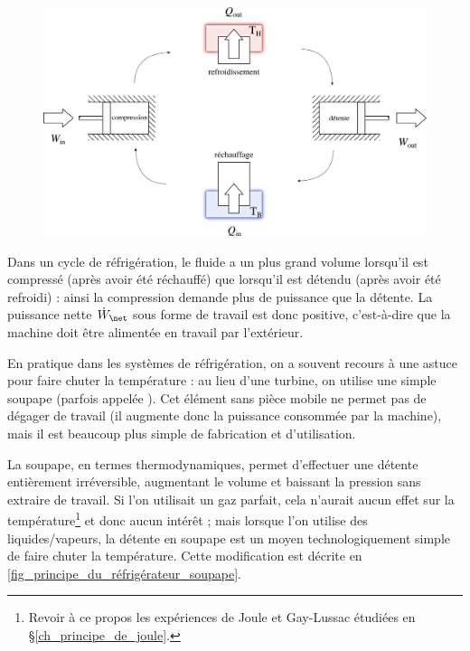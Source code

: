 			\begin{figure}
				\begin{center}
					\includegraphics[width=\textwidth]{images/refrigerateur_climatiseur_thermopompe_sf.png}
				\end{center}
				\label{fig_refrigerateur_climatiseur_thermopompe_sf}
			\end{figure}

			Dans un cycle de réfrigération, le fluide a un plus grand volume lorsqu’il est compressé (après avoir été réchauffé) que lorsqu’il est détendu (après avoir été refroidi) : ainsi la compression demande plus de puissance que la détente. La puissance nette $\dot W_\net$ sous forme de travail est donc positive, c’est-à-dire que la machine doit être alimentée en travail par l’extérieur.

			\clearfloats
			En pratique dans les systèmes de réfrigération, on a souvent recours à une astuce pour faire chuter la température : au lieu d’une turbine, on utilise une simple soupape (parfois appelée ). Cet élément sans pièce mobile ne permet pas de dégager de travail (il augmente donc la puissance consommée par la machine), mais il est beaucoup plus simple de fabrication et d’utilisation.

			La soupape, en termes thermodynamiques, permet d’effectuer une détente entièrement irréversible, augmentant le volume et baissant la pression sans extraire de travail. Si l’on utilisait un gaz parfait, cela n’aurait aucun effet sur la température\footnote{Revoir à ce propos les expériences de Joule et Gay-Lussac étudiées en \S\ref{ch_principe_de_joule}.} et donc aucun intérêt ; mais lorsque l’on utilise des liquides/vapeurs, la détente en soupape est un moyen technologiquement simple de faire chuter la température. Cette modification est décrite en \cref{fig_principe_du_réfrigérateur_soupape}.

